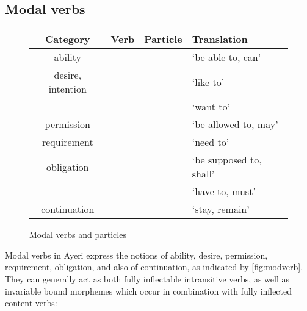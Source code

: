 \subsection{Modal verbs}
\label{subsec:modals}

\begin{figure}
\caption{Modal verbs and particles}
\begin{tabu} to \linewidth {C[3] X[2] X[2] X[4]}
\tableheaderfont\toprule
Category
	& Verb
	& Particle
	& Translation
	\\
\toprule

ability
	&  
	&  
	& `be able to, can'
	\\
	
\midrule
	
desire, intention
	&  
	&  
	& `like to'
	\\
	
	&  
	&  
	& `want to'
	\\
	
\midrule

permission
	&  
	&  
	& `be allowed to, may'
	\\
	
\midrule

requirement
	&  
	&  
	& `need to'
	\\
	
\midrule

obligation
	&  
	&  
	& `be supposed to, shall'
	\\
	
	&  
	&  
	& `have to, must'
	\\
	
\midrule
	
continuation
	&  
	&  
	& `stay, remain'
	\\

\bottomrule
\end{tabu}
\label{fig:modverb}
\end{figure}

Modal verbs in Ayeri express the notions of ability, desire, permission, 
requirement, obligation, and also of continuation, as indicated by 
\autoref{fig:modverb}. They can generally act as both fully inflectable 
intransitive verbs, as well as invariable bound morphemes which occur in 
combination with fully inflected content verbs:

